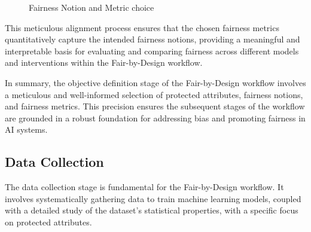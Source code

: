 \begin{figure}
    \centering
    \caption{Fairness Notion and Metric choice}
    \label{fig:choose}
\end{figure}

This meticulous alignment process ensures that the chosen fairness metrics quantitatively capture the intended fairness notions, providing a meaningful and interpretable basis for evaluating and comparing fairness across different models and interventions within the Fair-by-Design workflow.

In summary, the objective definition stage of the Fair-by-Design workflow involves a meticulous and well-informed selection of protected attributes, fairness notions, and fairness metrics. This precision ensures the subsequent stages of the workflow are grounded in a robust foundation for addressing bias and promoting fairness in AI systems.

\subsection{Data Collection}
\label{subsection:data_collection}

The data collection stage is fundamental for the Fair-by-Design workflow. It involves systematically gathering data to train machine learning models, coupled with a detailed study of the dataset's statistical properties, with a specific focus on protected attributes.

